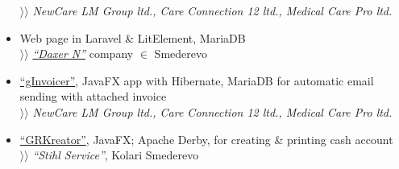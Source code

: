 \documentclass[12pt]{article}
\begin{document}
\begin{itemize}[parsep=1.5pt]
    $\rangle\!\rangle$ \textit{NewCare LM Group ltd., Care Connection 12 ltd., Medical Care Pro ltd.}
\item Web page in Laravel \& LitElement, MariaDB \\
    $\rangle\!\rangle$ \href{https://www.daxern.rs}{\textit{``Daxer N''}} company $\in$ Smederevo
\item \href{https://github.com/goranrsbg/gInvoicer}{``gInvoicer''}, JavaFX app with Hibernate, MariaDB for automatic email sending with attached invoice \\
    $\rangle\!\rangle$ \textit{NewCare LM Group ltd., Care Connection 12 ltd., Medical Care Pro ltd.}
\item \href{https://github.com/goranrsbg/GRKreator}{``GRKreator''}, JavaFX; Apache Derby, for creating \& printing cash account \\
    $\rangle\!\rangle$ \textit{``Stihl Service''}, Kolari Smederevo
\end{itemize}
\end{document}
